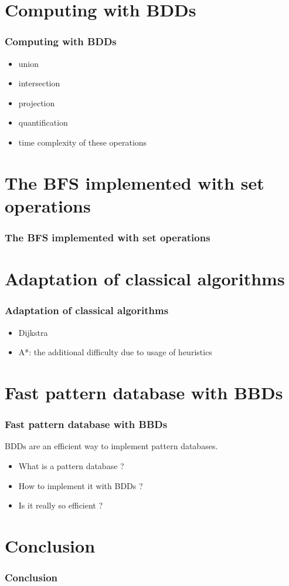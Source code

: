 \documentclass[10pt,a4paper]{beamer}
\begin{document}
\section{Computing with BDDs}
\begin{frame}
\frametitle{Computing with BDDs}

\begin{itemize}
\item union
\item intersection
\item projection
\item quantification
\item time complexity of these operations
\end{itemize}

\end{frame}

\section{The BFS implemented with set operations}
\begin{frame}
\frametitle{The BFS implemented with set operations}
\end{frame}

\section{Adaptation of classical algorithms}
\begin{frame}
\frametitle{Adaptation of classical algorithms}

	\begin{itemize}
	\item Dijkstra
	\item A*: the additional difficulty due to usage of heuristics
	\end{itemize}
\end{frame}

\section{Fast pattern database with BBDs}
\begin{frame}
\frametitle{Fast pattern database with BBDs}

BDDs are an efficient way to implement pattern databases.
\begin{itemize}
\item What is a pattern database ?
\item How to implement it with BDDs ?
\item Is it really so efficient ?
\end{itemize}
\end{frame}

\section{Conclusion}
\begin{frame}
\frametitle{Conclusion}

\end{frame}
\end{document}

